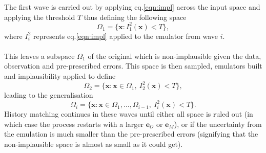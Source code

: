 \documentclass{article}
\newcommand{\emulator}{\hat{f}}
\newcommand{\inputVec}{\mathbf{x}}
\newcommand{\obsqD}{\mathbf{z}}
\newcommand{\obsErrorqD}{\mathbf{e}_O}
\newcommand{\modelDiscqD}{\mathbf{e}_M}
\newcommand{\impl}{I}
\newcommand{\NROYspace}{\Omega}
\newcommand{\thresh}{T}
\begin{document}
The first wave is carried out by applying eq.\eqref{eqn:impl} across the input space and applying the threshold $\thresh$ thus defining the following space \[\NROYspace_1 = \{\inputVec : \impl_1^2(\inputVec) < \thresh \},\] where $\impl_i^2$ represents eq.\eqref{eqn:impl} applied to the emulator from wave $i$.\\\\
This leaves a subspace $\NROYspace_1$ of the original which is non-implausible given the data, observation and pre-prescribed errors. This space is then sampled, emulators built and implausibility applied to define \[\NROYspace_2 = \{\inputVec: \inputVec \in \NROYspace_1, \ \impl_2^2(\inputVec) < \thresh \},\] leading to the generalisation \[\NROYspace_i = \{\inputVec: \inputVec \in \NROYspace_1,\dots,\NROYspace_{i-1}, \ \impl_i^2(\inputVec) < \thresh \}.\] History matching continues in these waves until either all space is ruled out (in which case the process restarts with a larger $\obsErrorqD$ or $\modelDiscqD$), or if the uncertainty from the emulation is much smaller than the pre-prescribed errors (signifying that the non-implausible space is almost as small as it could get).
\end{document}
